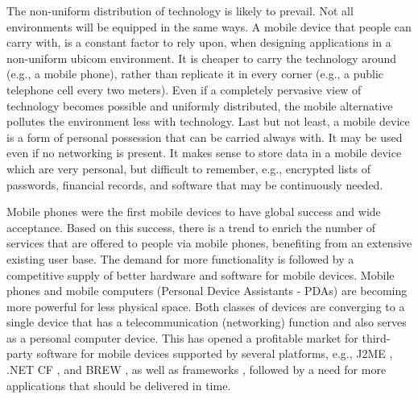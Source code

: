 \begin{enumerate}[a.]
The non-uniform distribution of technology is likely to prevail. Not all environments will be equipped in the same ways. A mobile device that people can carry with, is a constant factor to rely upon, when designing applications in a non-uniform ubicom environment. It is cheaper to carry the technology around (e.g., a mobile phone), rather than replicate it in every corner (e.g., a public telephone cell every two meters). Even if a completely pervasive view of technology becomes possible and uniformly distributed, the mobile alternative pollutes the environment less with technology. Last but not least, a mobile device is a form of personal possession that can be carried always with. It may be used even if no networking is present. It makes sense to store data in a mobile device which are very personal, but difficult to remember, e.g., encrypted lists of passwords, financial records, and software that may be continuously needed.

Mobile phones were the first mobile devices to have global success and wide acceptance. Based on this success, there is a trend to enrich the number of services that are offered to people via mobile phones, benefiting from an extensive existing user base. The demand for more functionality is followed by a competitive supply of better hardware \cite{j2me.2005} and software for mobile devices. 
Mobile phones and mobile computers (Personal Device Assistants - PDAs) are becoming more powerful for less physical space. Both classes of devices are converging to a single device that has a telecommunication (networking) function and also serves as a personal computer device. This has opened a profitable market for third-party software for mobile devices supported by several platforms, e.g., J2ME \cite{www.j2me}, .NET CF \cite{dnetcf}, and BREW \cite{brew}, as well as frameworks \cite{ubi.infra.survey}, followed by a need for more applications that should be delivered in time. 

\end{enumerate}


